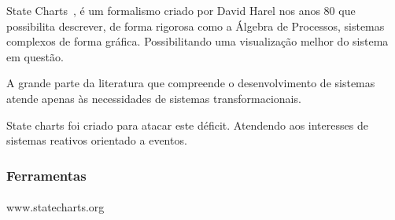 State Charts~\cite{Harel:1987:SVF:34884.34886},
é um formalismo criado por David Harel nos anos 80
que possibilita descrever, de forma rigorosa como a
Álgebra de Processos, sistemas complexos de forma gráfica.
Possibilitando uma visualização melhor do sistema em questão.

A grande parte da literatura que compreende o desenvolvimento
de sistemas atende apenas às necessidades de sistemas transformacionais.

State charts foi criado para atacar este déficit. Atendendo aos interesses 
de  sistemas reativos orientado a eventos.

\subsubsection{Ferramentas}
\paragraph{}
www.statecharts.org

